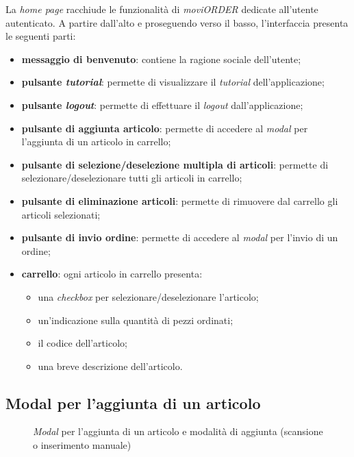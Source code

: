 La \textit{home page} racchiude le funzionalità di \textit{moviORDER} dedicate all'utente autenticato. A partire dall'alto e proseguendo verso il basso, l'interfaccia presenta le seguenti parti:
\begin{itemize}
	\item \textbf{messaggio di benvenuto}: contiene la ragione sociale dell'utente;
	\item \textbf{pulsante \textit{tutorial}}: permette di visualizzare il \textit{tutorial} dell'applicazione;
	\item \textbf{pulsante \textit{logout}}: permette di effettuare il \textit{logout} dall'applicazione;
	\item \textbf{pulsante di aggiunta articolo}: permette di accedere al \textit{modal} per l'aggiunta di un articolo in carrello; 
	\item \textbf{pulsante di selezione/deselezione multipla di articoli}: permette di selezionare/deselezionare tutti gli articoli in carrello;
	\item \textbf{pulsante di eliminazione articoli}: permette di rimuovere dal carrello gli articoli selezionati;
	\item \textbf{pulsante di invio ordine}: permette di accedere al \textit{modal} per l'invio di un ordine;
	\item \textbf{carrello}: ogni articolo in carrello presenta:
	\begin{itemize}
		\item una \textit{checkbox} per selezionare/deselezionare l'articolo;
		\item un'indicazione sulla quantità di pezzi ordinati;
		\item il codice dell'articolo;
		\item una breve descrizione dell'articolo.
	\end{itemize}
\end{itemize}

\subsection{Modal per l'aggiunta di un articolo}

\begin{figure}[!h] 
    \centering 
    \caption{\textit{Modal} per l'aggiunta di un articolo e modalità di aggiunta (scansione o inserimento manuale)}
\end{figure}


